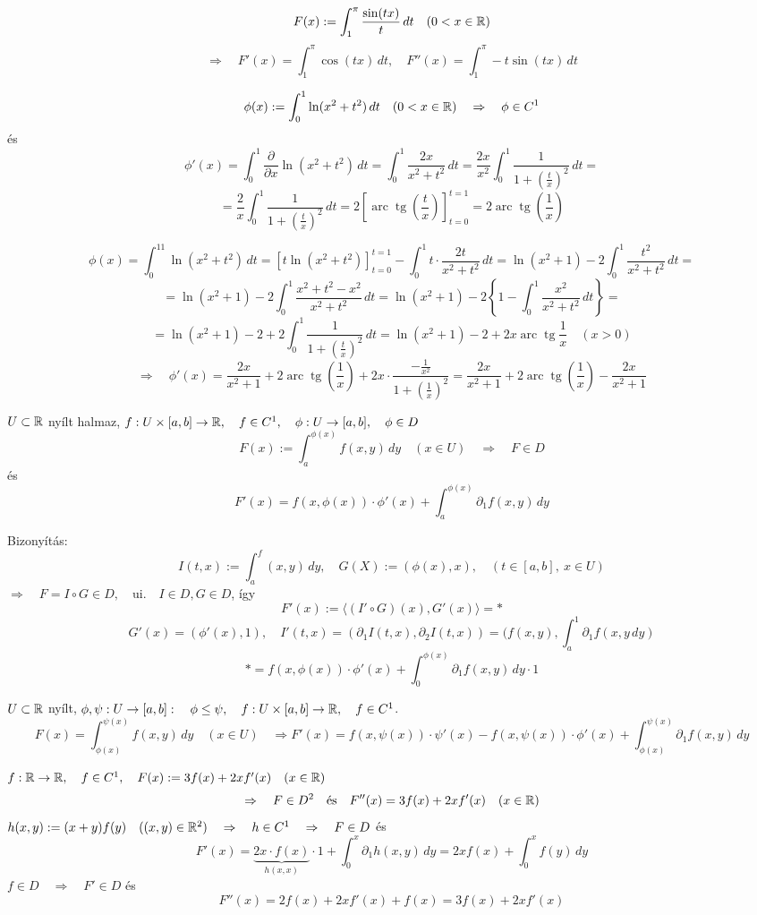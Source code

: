 \documentclass[a4paper,11.5pt]{article}
\DeclareMathOperator{\tg}{tg}
\DeclareMathOperator{\arc}{arc}
\begin{document}
	\begin{example}
		\[ F(x):=\int_1^\pi \frac{\sin(tx)}{t}\,dt\quad (0<x\in\mathbb{R}) \]
		\[ \Rightarrow\quad F'(x)=\int_1^\pi\cos(tx)\,dt,\quad F''(x)=\int_1^\pi -t\sin(tx)\,dt \]
	\end{example}
	\begin{example}
		$$\phi(x):=\int_0^1\ln(x^2+t^2)\,dt\quad (0<x\in\mathbb{R})\quad \Rightarrow\quad \phi\in C^1$$ és $$\phi'(x)=\int_0^1\frac{\partial}{\partial x}\ln(x^2+t^2)\,dt=\int_0^1\frac{2x}{x^2+t^2}\,dt=\frac{2x}{x^2}\int_0^1\frac{1}{1+\left(\frac{t}{x}\right)^2}\,dt=$$
		$$=\frac{2}{x}\int_0^1\frac{1}{1+\left(\frac{t}{x}\right)^2}\,dt=2\left[\arc\tg\left(\frac{t}{x}\right)\right]_{t=0}^{t=1}=2\arc\tg\left(\frac{1}{x}\right)$$
	\end{example}
	\begin{note}
		$$\phi(x)=\int_0^11\ln(x^2+t^2)\,dt=[t\ln(x^2+t^2)]_{t=0}^{t=1}-\int_0^1t\cdot\frac{2t}{x^2+t^2}\,dt=\ln(x^2+1)-2\int_0^1\frac{t^2}{x^2+t^2}\,dt=$$
		$$=\ln(x^2+1)-2\int_0^1\frac{x^2+t^2-x^2}{x^2+t^2}\,dt=\ln(x^2+1)-2\left\{ 1-\int_0^1\frac{x^2}{x^2+t^2}\,dt \right\}=$$ $$=\ln(x^2+1)-2+2\int_0^1\frac{1}{1+\left(\frac{t}{x}\right)^2}\,dt=\ln(x^2+1)-2+2x\arc\tg\frac{1}{x}\quad (x>0)$$
		$$\Rightarrow\quad \phi'(x)=\frac{2x}{x^2+1}+2\arc\tg\left(\frac{1}{x}\right)+2x\cdot\frac{-\frac{1}{x^2}}{1+\left(\frac{1}{x}\right)^2}=\frac{2x}{x^2+1}+2\arc\tg\left(\frac{1}{x}\right)-\frac{2x}{x^2+1}$$
	\end{note}
	\begin{theorem}
		$U\subset\mathbb{R}$ nyílt halmaz, $f:U\times[a,b]\to\mathbb{R},\quad f\in C^1,\quad \phi:U\to[a,b],\quad \phi\in D$
		\[ F(x):=\int_a^{\phi(x)}f(x,y)\,dy\quad (x\in U)\quad \Rightarrow\quad F\in D \]
		és
		\[ F'(x)=f(x,\phi(x))\cdot\phi'(x)+\int_a^{\phi(x)}\partial_1 f(x,y)\,dy \]
		
		Bizonyítás: 
		\[ I(t,x):=\int_a^f(x,y) \,dy,\quad G(X):=(\phi(x),x),\quad (t\in[a,b],\ x\in U) \]
		$ \Rightarrow\quad F=I\circ G\in D,\quad \text{ui.}\quad I\in D, G\in D$, így
		\[ F'(x):=\langle (I'\circ G)(x),G'(x)\rangle=* \]
		\[ G'(x)=(\phi'(x),1),\quad I'(t,x)=(\partial_1I(t,x),\partial_2I(t,x))=(f(x,y),\int_a^1\partial_1f\left(x,y\,dy\right) \]
		\[ *=f(x,\phi(x))\cdot \phi'(x)+\int_0^{\phi(x)}\partial_1f(x,y)\,dy\cdot1 \]
	\end{theorem}
	\begin{note}
		$U\subset\mathbb{R}$ nyílt, $\phi, \psi:U\to[a,b]:\quad \phi\leq\psi,\quad f:U\times[a,b]\to\mathbb{R},\quad f\in C^1$.
		\[ F(x)=\int_{\phi(x)}^{\psi(x)}f(x,y)\,dy\quad (x\in U)\quad \Rightarrow F'(x)=f(x,\psi(x))\cdot\psi'(x)-f(x,\psi(x))\cdot\phi'(x)+\int_{\phi(x)}^{\psi(x)}\partial_1f(x,y)\,dy \]
	\end{note}
	\begin{example}
		$f:\mathbb{R}\to\mathbb{R},\quad f\in C^1,\quad F(x):=3f(x)+2xf'(x)\quad (x\in\mathbb{R})$
		\[ \Rightarrow\quad F\in D^2\quad \text{és}\quad F''(x)=3f(x)+2xf'(x)\quad (x\in\mathbb{R}) \]
		$h(x,y):=(x+y)f(y)\quad ((x,y)\in\mathbb{R}^2)\quad \Rightarrow\quad h\in C^1\quad \Rightarrow\quad F\in D$ és
		\[ F'(x)=\underbrace{2x\cdot f(x)}_{h(x,x)}\cdot1+\int_0^x\partial_1h(x,y)\,dy=2xf(x)+\int_0^xf(y)\,dy \]
		$f\in D\quad \Rightarrow\quad F'\in D$ és 
		\[ F''(x)=2f(x)+2xf'(x)+f(x)=3f(x)+2xf'(x) \]   
	\end{example}
\end{document}
